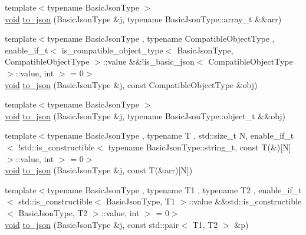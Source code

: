 \begin{DoxyCompactItemize}
\item 
{\footnotesize template$<$typename Basic\+Json\+Type $>$ }\\\hyperlink{namespacenlohmann_1_1detail_a59fca69799f6b9e366710cb9043aa77d}{void} \hyperlink{namespacenlohmann_1_1detail_aa0fd1b5788e9ba37e31da43dda738cb5}{to\+\_\+json} (Basic\+Json\+Type \&j, typename Basic\+Json\+Type\+::array\+\_\+t \&\&arr)
\item 
{\footnotesize template$<$typename Basic\+Json\+Type , typename Compatible\+Object\+Type , enable\+\_\+if\+\_\+t$<$ is\+\_\+compatible\+\_\+object\+\_\+type$<$ Basic\+Json\+Type, Compatible\+Object\+Type $>$\+::value \&\&!is\+\_\+basic\+\_\+json$<$ Compatible\+Object\+Type $>$\+::value, int $>$  = 0$>$ }\\\hyperlink{namespacenlohmann_1_1detail_a59fca69799f6b9e366710cb9043aa77d}{void} \hyperlink{namespacenlohmann_1_1detail_a24c9c12f3839c94e09532f08de85e949}{to\+\_\+json} (Basic\+Json\+Type \&j, const Compatible\+Object\+Type \&obj)
\item 
{\footnotesize template$<$typename Basic\+Json\+Type $>$ }\\\hyperlink{namespacenlohmann_1_1detail_a59fca69799f6b9e366710cb9043aa77d}{void} \hyperlink{namespacenlohmann_1_1detail_ac9f7a5542851c61d93740148eaec509f}{to\+\_\+json} (Basic\+Json\+Type \&j, typename Basic\+Json\+Type\+::object\+\_\+t \&\&obj)
\item 
{\footnotesize template$<$typename Basic\+Json\+Type , typename T , std\+::size\+\_\+t N, enable\+\_\+if\+\_\+t$<$ !std\+::is\+\_\+constructible$<$ typename Basic\+Json\+Type\+::string\+\_\+t, const T(\&)\mbox{[}\+N\mbox{]}$>$\+::value, int $>$  = 0$>$ }\\\hyperlink{namespacenlohmann_1_1detail_a59fca69799f6b9e366710cb9043aa77d}{void} \hyperlink{namespacenlohmann_1_1detail_a20ea5175c8999fc8b673e46b892f71f6}{to\+\_\+json} (Basic\+Json\+Type \&j, const T(\&arr)\mbox{[}N\mbox{]})
\item 
{\footnotesize template$<$typename Basic\+Json\+Type , typename T1 , typename T2 , enable\+\_\+if\+\_\+t$<$ std\+::is\+\_\+constructible$<$ Basic\+Json\+Type, T1 $>$\+::value \&\&std\+::is\+\_\+constructible$<$ Basic\+Json\+Type, T2 $>$\+::value, int $>$  = 0$>$ }\\\hyperlink{namespacenlohmann_1_1detail_a59fca69799f6b9e366710cb9043aa77d}{void} \hyperlink{namespacenlohmann_1_1detail_ab64eeb55b44db44eb8e9070229eb97df}{to\+\_\+json} (Basic\+Json\+Type \&j, const std\+::pair$<$ T1, T2 $>$ \&p)
\item 

\end{DoxyCompactItemize}

